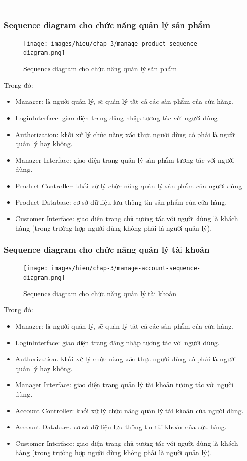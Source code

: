 \begin {list} {-}{}
\subsubsection{Sequence diagram cho chức năng quản lý sản phẩm}
\begin{figure}[H]
    \centering
    \texttt{[image: images/hieu/chap-3/manage-product-sequence-diagram.png]}
    \caption{Sequence diagram cho chức năng quản lý sản phẩm}
\end{figure}
\noindent Trong đó:
\begin{itemize}
    \item Manager: là người quản lý, sẽ quản lý tất cả các sản phẩm của cửa hàng.
    \item LoginInterface: giao diện trang đăng nhập tương tác với người dùng.
    \item Authorization: khối xử lý chức năng xác thực người dùng có phải là người quản lý hay không.
    \item Manager Interface: giao diện trang quản lý sản phẩm tương tác với người dùng.
    \item Product Controller: khối xử lý chức năng quản lý sản phẩm của người dùng.
    \item Product Database: cơ sở dữ liệu lưu thông tin sản phẩm của cửa hàng.
    \item Customer Interface: giao diện trang chủ tương tác với người dùng là khách hàng (trong trường hợp người dùng không phải là người quản lý).
\end{itemize}
\newpage
\subsubsection{Sequence diagram cho chức năng quản lý tài khoản}
\begin{figure}[H]
    \centering
    \texttt{[image: images/hieu/chap-3/manage-account-sequence-diagram.png]}
    \caption{Sequence diagram cho chức năng quản lý tài khoản}
\end{figure}
\noindent Trong đó:
\begin{itemize}
    \item Manager: là người quản lý, sẽ quản lý tất cả các sản phẩm của cửa hàng.
    \item LoginInterface: giao diện trang đăng nhập tương tác với người dùng.
    \item Authorization: khối xử lý chức năng xác thực người dùng có phải là người quản lý hay không.
    \item Manager Interface: giao diện trang quản lý tài khoản tương tác với người dùng.
    \item Account Controller: khối xử lý chức năng quản lý tài khoản của người dùng.
    \item Account Database: cơ sở dữ liệu lưu thông tin tài khoản của cửa hàng.
    \item Customer Interface: giao diện trang chủ tương tác với người dùng là khách hàng (trong trường hợp người dùng không phải là người quản lý).
\end{itemize}
\newpage

\end{list}
